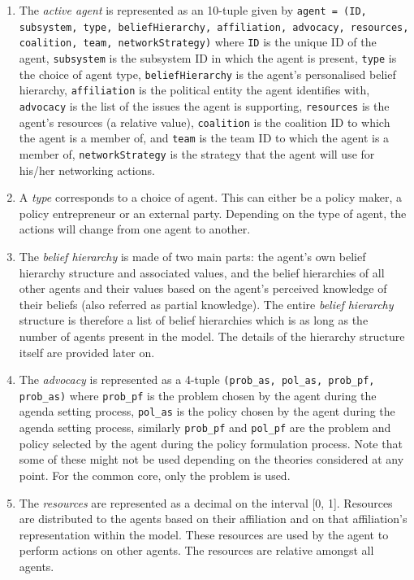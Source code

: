 \begin{enumerate}

\item The \emph{active agent} is represented as an 10-tuple given by \texttt{agent = (ID, subsystem, type, beliefHierarchy, affiliation, advocacy, resources, coalition, team, networkStrategy)} where
\texttt{ID} is the unique ID of the agent,
\texttt{subsystem} is the subsystem ID in which the agent is present,  
\texttt{type} is the choice of agent type, 
\texttt{beliefHierarchy} is the agent's personalised belief hierarchy, 
\texttt{affiliation} is the political entity the agent identifies with,  
\texttt{advocacy} is the list of the issues the agent is supporting, 
\texttt{resources} is the agent's resources (a relative value), 
\texttt{coalition} is the coalition ID to which the agent is a member of, and 
\texttt{team} is the team ID to which the agent is a member of,
\texttt{networkStrategy} is the strategy that the agent will use for his/her networking actions.

\item A \emph{type} corresponds to a choice of agent. This can either be a policy maker, a policy entrepreneur or an external party. Depending on the type of agent, the actions will change from one agent to another.

\item The \emph{belief hierarchy} is made of two main parts: the agent's own belief hierarchy structure and associated values, and the belief hierarchies of all other agents and their values based on the agent's perceived knowledge of their beliefs (also referred as partial knowledge). The entire \emph{belief hierarchy} structure is therefore a list of belief hierarchies which is as long as the number of agents present in the model. The details of the hierarchy structure itself are provided later on.

\item The \emph{advocacy} is represented as a 4-tuple \texttt{(prob\_as, pol\_as, prob\_pf, prob\_as)} where \texttt{prob\_pf} is the problem chosen by the agent during the agenda setting process, \texttt{pol\_as} is the policy chosen by the agent during the agenda setting process, similarly \texttt{prob\_pf} and \texttt{pol\_pf} are the problem and policy selected by the agent during the policy formulation process. Note that some of these might not be used depending on the theories considered at any point. For the common core, only the problem is used.

\item The \emph{resources} are represented as a decimal on the interval [0, 1]. Resources are distributed to the agents based on their affiliation and on that affiliation's representation within the model. These resources are used by the agent to perform actions on other agents. The resources are relative amongst all agents.


\end{enumerate}
